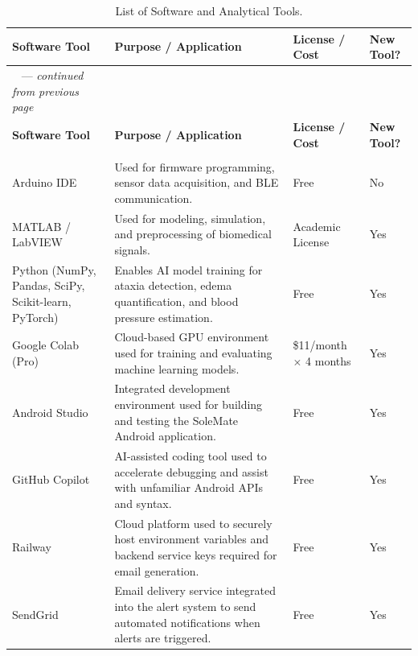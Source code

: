 \begingroup
\footnotesize
\setlength{\tabcolsep}{3.5pt}%
\setlength{\LTpre}{6pt}%
\setlength{\LTpost}{6pt}%
\setlength{\LTleft}{0pt}%
\setlength{\LTright}{0pt}%
\renewcommand{\arraystretch}{1.2}%
\begin{longtable}{|>{\raggedright\arraybackslash}p{2.85cm}|>{\raggedright\arraybackslash}p{8.55cm}|>{\raggedright\arraybackslash}p{1.95cm}|>{\centering\arraybackslash}p{1.25cm}|}
\caption{List of Software and Analytical Tools.}\label{tab:software}\\
\hline
\textbf{Software Tool} & \textbf{Purpose / Application} & \textbf{License / Cost} & \textbf{New Tool?} \\
\hline
\endfirsthead
\multicolumn{4}{c}%
{{\tablename\ \thetable{} --- \textit{continued from previous page}}} \\
\hline
\textbf{Software Tool} & \textbf{Purpose / Application} & \textbf{License / Cost} & \textbf{New Tool?} \\
\hline
\endhead
\hline
\multicolumn{4}{r}{\small\emph{Continued on next page\ldots}} \\
\endfoot
\hline
\endlastfoot
Arduino IDE & Used for firmware programming, sensor data acquisition, and BLE communication. & Free & No \\ \hline
MATLAB / LabVIEW & Used for modeling, simulation, and preprocessing of biomedical signals. & Academic License & Yes \\ \hline
Python (NumPy, Pandas, SciPy, Scikit-learn, PyTorch) & Enables AI model training for ataxia detection, edema quantification, and blood pressure estimation. & Free & Yes \\ \hline
Google Colab (Pro) & Cloud-based GPU environment used for training and evaluating machine learning models. & \$11/month $\times$ 4 months & Yes \\ \hline
Android Studio & Integrated development environment used for building and testing the SoleMate Android application. & Free & Yes \\ \hline
GitHub Copilot & AI-assisted coding tool used to accelerate debugging and assist with unfamiliar Android APIs and syntax. & Free & Yes \\ \hline
Railway & Cloud platform used to securely host environment variables and backend service keys required for email generation. & Free & Yes \\ \hline
SendGrid & Email delivery service integrated into the alert system to send automated notifications when alerts are triggered. & Free & Yes \\ \hline

\end{longtable}
